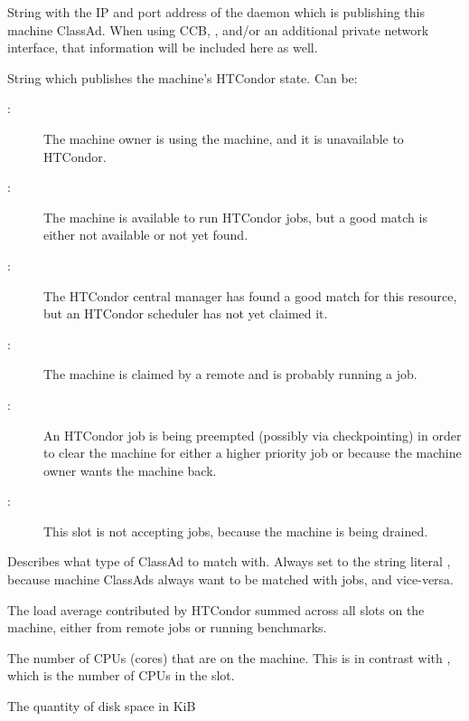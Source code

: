 \begin{description}
%
\item[\AdAttr{StartdIpAddr}:] String with the IP and port address of the
 daemon which is publishing this machine ClassAd.
When using CCB, , and/or an additional private
network interface, that information will be included here as well.

%
\item[\AdAttr{State}:] String which publishes the machine's HTCondor state.
Can be:
	\begin{description}
	\item[:] The machine owner is using the machine, and
it is unavailable to HTCondor.
	\item[:] The machine is available to run HTCondor jobs,
but a good match is either not available or not 
yet found.
	\item[:] The HTCondor central manager has found a good
match for this resource, but an HTCondor scheduler has not yet claimed it.
	\item[:] The machine is claimed by a remote
 and is probably running a job.
	\item[:] An HTCondor job is being preempted (possibly
via checkpointing) in order to clear the machine for either a higher
priority job or because the machine owner wants the machine back.
	\item[:] This slot is not accepting jobs,
because the machine is being drained.
	\end{description}   %
%
\item[\AdAttr{TargetType}:] Describes what type of ClassAd to match with.
Always set to the string literal , because machine ClassAds
always want to be matched with jobs, and vice-versa.
%
\item[\AdAttr{TotalCondorLoadAvg}:] The load average contributed  
by HTCondor summed across all slots on the machine, 
either from remote jobs or running benchmarks.
%
\item[\AdAttr{TotalCpus}:] The number of CPUs (cores) that are on the machine.
This is in contrast with ,
which is the number of CPUs in the slot.
%
\item[\AdAttr{TotalDisk}:] The quantity of disk space in KiB

\end{description}
